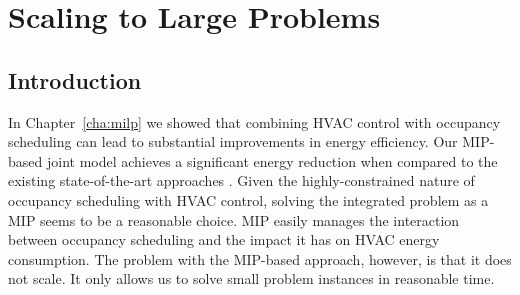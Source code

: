 






\chapter{Scaling to Large Problems}
\label{cha:lns}

\section{Introduction}

In Chapter~\ref{cha:milp} we showed that combining HVAC control with occupancy scheduling can lead to substantial improvements in energy efficiency. Our MIP-based joint model achieves a significant energy reduction when compared to the existing state-of-the-art approaches \citep{goyal2013occupancy,kwak2013tesla,majumdar2012energy,chai2014minimizing}.
Given the highly-constrained nature of occupancy scheduling with HVAC control, solving the integrated problem as a MIP seems to be a reasonable choice. MIP easily manages the interaction between occupancy scheduling and the impact it has on HVAC energy consumption. The problem with the MIP-based approach, however, is that it does not scale. It only allows us to solve small problem instances in reasonable time. 

